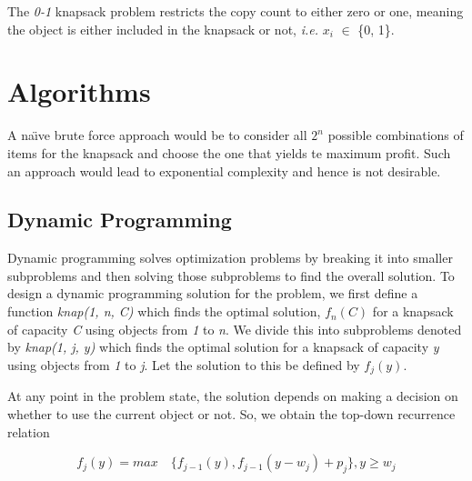 \documentclass{article}
\begin{document}
The \textit{0-1} knapsack problem restricts the copy count to either zero or one, meaning the object is either included in the knapsack or not, \textit{i.e.} \textit{$x_{i}$} $\in$ \{0, 1\}.

\section{Algorithms}
A na\"{\i}ve brute force approach would be to consider all $2^{n}$ possible combinations of items for the knapsack and choose the one that yields te maximum profit. Such an approach would lead to exponential complexity and hence is not desirable.
\subsection{Dynamic Programming}
Dynamic programming solves optimization problems by breaking it into smaller subproblems and then solving those subproblems to find the overall solution. \iffalse To solve a problem using dynamic programming, it should have two important characteristics:
\begin{itemize}
	\item \textit{Optimal Substructure}: This means that the overall optimal solution to a problem comprises optimal solutions to the subproblems.
	\item \textit{Overlapping Subproblems}: This means that any algorithm used to solve the problem should be solving a subset of the subproblems over and over again instead of generating new subproblems. Dynamic programming stores the results of these subproblems and uses them whenever the subproblem is encountered again. This is called \textit{memoization}.
\end{itemize}\fi
To design a dynamic programming solution for the problem, we first define a function \textit{knap(1, n, C)} which finds the optimal solution, $f_{n}(C)$ for a knapsack of capacity \textit{C} using objects from \textit{1} to \textit{n}. We divide this into subproblems denoted by \textit{knap(1, j, y)} which finds the optimal solution for a knapsack of capacity \textit{y} using objects from \textit{1} to \textit{j}. Let the solution to this be defined by $f_{j}(y)$.

At any point in the problem state, the solution depends on making a decision on whether to use the current object or not. So, we obtain the top-down recurrence relation

\begin{equation} \label{eq:knapeq1}
	f_{j}(y) = max \quad \{f_{j-1}(y), f_{j-1}(y-w_{j}) + p_{j}\}, {y \ge w_{j}}
\end{equation}
\end{document}
